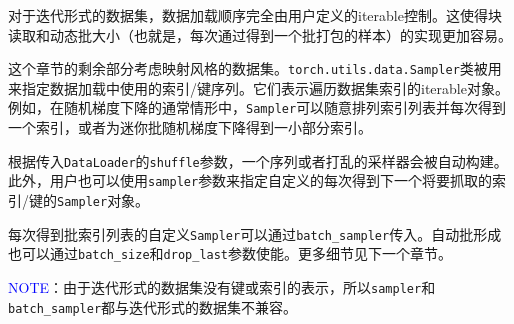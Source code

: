 \documentclass[../main.tex]{subfile}
\begin{document}
对于迭代形式的数据集，数据加载顺序完全由用户定义的iterable控制。这使得块读取和动态批大小（也就是，每次通过得到一个批打包的样本）的实现更加容易。

这个章节的剩余部分考虑映射风格的数据集。\lstinline{torch.utils.data.Sampler}类被用来指定数据加载中使用的索引/键序列。它们表示遍历数据集索引的iterable对象。例如，在随机梯度下降的通常情形中，\lstinline{Sampler}可以随意排列索引列表并每次得到一个索引，或者为迷你批随机梯度下降得到一小部分索引。

根据传入\lstinline{DataLoader}的\lstinline{shuffle}参数，一个序列或者打乱的采样器会被自动构建。此外，用户也可以使用\lstinline{sampler}参数来指定自定义的每次得到下一个将要抓取的索引/键的\lstinline{Sampler}对象。

每次得到批索引列表的自定义\lstinline{Sampler}可以通过\lstinline{batch_sampler}传入。自动批形成也可以通过\lstinline{batch_size}和\lstinline{drop_last}参数使能。更多细节见下一个章节。

\textcolor{blue}{NOTE}：由于迭代形式的数据集没有键或索引的表示，所以\lstinline{sampler}和\lstinline{batch_sampler}都与迭代形式的数据集不兼容。
\end{document}
